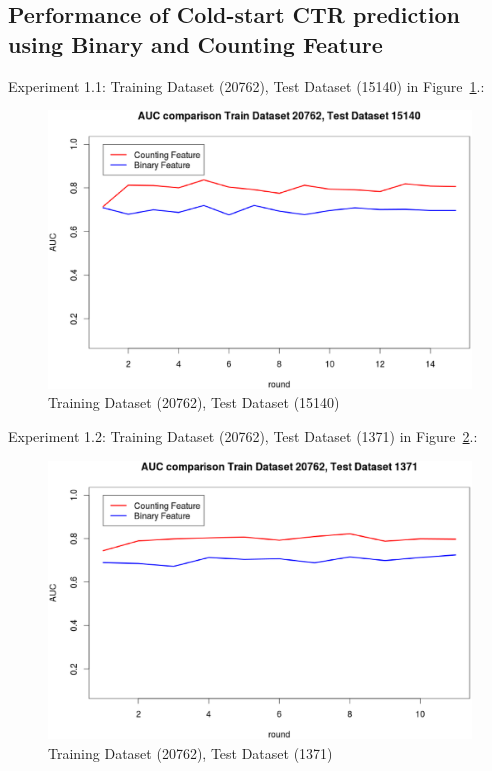 \documentclass{sig-alternate}
\begin{document}
\subsection{Performance of Cold-start CTR prediction using Binary and Counting Feature}

Experiment 1.1: Training Dataset  (20762), Test Dataset  (15140) in Figure~\ref{fig:fig1}.:
\begin{figure}[t]
\centering
\includegraphics[width=\columnwidth]{20762_15140.eps}
\caption{Training Dataset  (20762), Test Dataset  (15140)}
\label{fig:fig1}
\end{figure}

Experiment 1.2: Training Dataset  (20762), Test Dataset  (1371) in Figure~\ref{fig:fig2}.:
\begin{figure}[t]
\centering
\includegraphics[width=\columnwidth]{20762_1371.eps}
\caption{Training Dataset  (20762), Test Dataset  (1371)}
\label{fig:fig2}
\end{figure}
\end{document}
